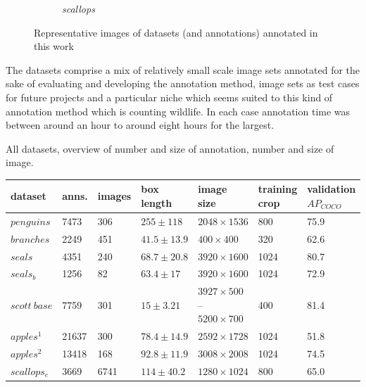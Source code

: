 \begin{figure}[h!]
\begin{subfigure}[t]{0.24\linewidth}
  \caption{\emph{scallops}}
\end{subfigure}
\caption{Representative images of datasets (and annotations) annotated in this work}
\label{fig:datasets_all}
\end{figure}

The datasets comprise a mix of relatively small scale image sets annotated for the sake of evaluating and developing the annotation method, image sets as test cases for future projects and a particular niche which seems suited to this kind of annotation method which is counting wildlife. In each case annotation time was between around an hour to around eight hours for the largest.

\begin{threeparttable}[!h]
\label{fig:resolutions}
\centering
\caption{All datasets, overview of number and size of annotation, number and size of image.  } 
\begin{tabular}{lllllll}
dataset & anns. & images & box length & image size & \shortstack{training \\ crop} & \shortstack{validation \\ $AP_{COCO}$} \\
\toprule
$penguins$        & 7473        & 306    & $255 \pm 118$   &  $2048\times1536$  & 800                                   & 75.9                   \\
$branches$        & 2249        & 451    & $41.5 \pm 13.9$ &  $400\times400$    & 320                                   & 62.6                   \\
$seals$           & 4351        & 240    & $68.7 \pm 20.8$ &  $3920\times1600$  & 1024                                    & 80.7                   \\
$seals_b$         & 1256        & 82     & $63.4 \pm 17$   & $3920\times1600$  & 1024                                                     & 72.9        \\
$scott\:base$     & 7759        & 301    & $15 \pm 3.21$     & \shortstack[l]{$3927\times500$ -- \\ $5200\times700$} & 400  & 81.4  \\
$apples^1$        & 21637       & 300    & $78.4 \pm 14.9$ &  $2592\times1728$ & 1024 & 51.8                   \\
$apples^2$        & 13418       & 168    & $92.8 \pm 11.9$ &  $3008\times2008$  & 1024                                    & 74.5                   \\
$scallops_e$      & 3669        & 6741   & $114 \pm 40.2$  &  $1280\times1024$  & 800                                   & 65.0                   \\

\end{tabular}
\end{threeparttable}
